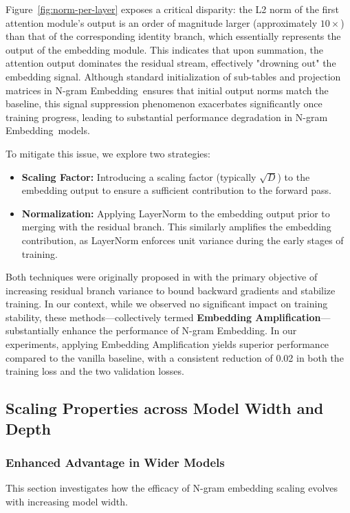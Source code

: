 \documentclass{article}
\newcommand{\method}{N-gram Embedding}
\begin{document}
Figure~\ref{fig:norm-per-layer} exposes a critical disparity: the L2 norm of the first attention module's output is an order of magnitude larger (approximately $10\times$) than that of the corresponding identity branch, which essentially represents the output of the embedding module. This indicates that upon summation, the attention output dominates the residual stream, effectively "drowning out" the embedding signal. Although standard initialization of sub-tables and projection matrices in \method\ ensures that initial output norms match the baseline, this signal suppression phenomenon exacerbates significantly once training progress, leading to substantial performance degradation in \method\ models.

To mitigate this issue, we explore two strategies:
\begin{itemize}
    \item \textbf{Scaling Factor:} Introducing a scaling factor (typically $\sqrt{D}$) to the embedding output to ensure a sufficient contribution to the forward pass.
    \item \textbf{Normalization:} Applying LayerNorm to the embedding output prior to merging with the residual branch. This similarly amplifies the embedding contribution, as LayerNorm enforces unit variance during the early stages of training.
\end{itemize}

Both techniques were originally proposed in \cite{takase2025spikemorestabilizingpretraining} with the primary objective of increasing residual branch variance to bound backward gradients and stabilize training. In our context, while we observed no significant impact on training stability, these methods---collectively termed \textbf{Embedding Amplification}---substantially enhance the performance of \method. 
In our experiments, applying Embedding Amplification yields superior performance compared to the vanilla baseline, with a consistent reduction of 0.02 in both the training loss and the two validation losses.
 

\subsection{Scaling Properties across Model Width and Depth}
\subsubsection{Enhanced Advantage in Wider Models} 
This section investigates how the efficacy of N-gram embedding scaling evolves with increasing model width.
\end{document}
